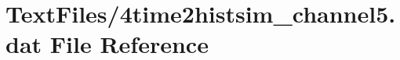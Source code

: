 \hypertarget{4time2histsim__channel5_8dat}{}\section{Text\+Files/4time2histsim\+\_\+channel5.dat File Reference}
\label{4time2histsim__channel5_8dat}
